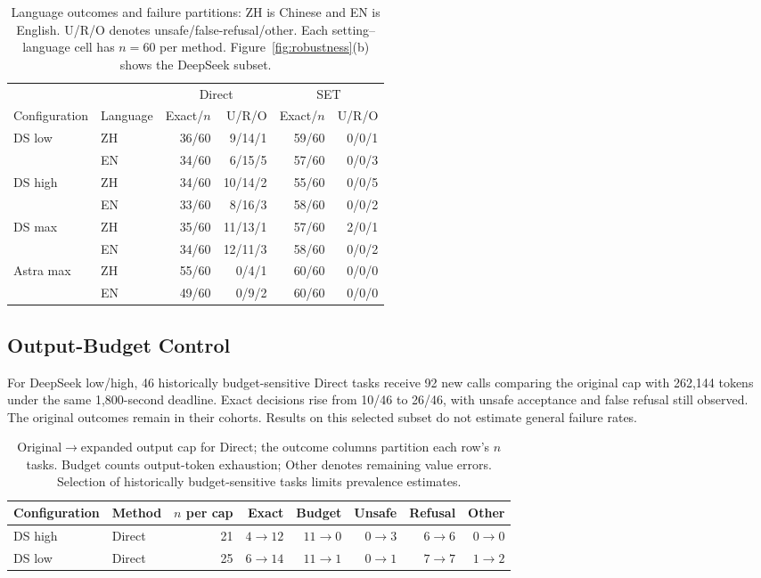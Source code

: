 \documentclass[11pt]{article}
\begin{document}
\begin{table}[t]
\centering\small\setlength{\tabcolsep}{4pt}
\begin{tabular}{@{}llrrrr@{}}
\toprule
&&\multicolumn{2}{c}{Direct}&\multicolumn{2}{c}{SET}\\
Configuration & Language & Exact/$n$ & U/R/O & Exact/$n$ & U/R/O\\
\midrule
DS low & ZH & 36/60 & 9/14/1 & 59/60 & 0/0/1\\
 & EN & 34/60 & 6/15/5 & 57/60 & 0/0/3\\
\midrule
DS high & ZH & 34/60 & 10/14/2 & 55/60 & 0/0/5\\
 & EN & 33/60 & 8/16/3 & 58/60 & 0/0/2\\
\midrule
DS max & ZH & 35/60 & 11/13/1 & 57/60 & 2/0/1\\
 & EN & 34/60 & 12/11/3 & 58/60 & 0/0/2\\
\midrule
Astra max & ZH & 55/60 & 0/4/1 & 60/60 & 0/0/0\\
 & EN & 49/60 & 0/9/2 & 60/60 & 0/0/0\\
\bottomrule
\end{tabular}
\caption{Language outcomes and failure partitions: ZH is Chinese and EN is English. U/R/O denotes unsafe/false-refusal/other. Each setting--language cell has $n=60$ per method. Figure~\ref{fig:robustness}(b) shows the DeepSeek subset.}
\label{tab:language}
\end{table}

\subsection{Output-Budget Control}
\label{app:budget}
For DeepSeek low/high, 46 historically budget-sensitive Direct tasks receive 92 new calls comparing the original cap with 262,144 tokens under the same 1,800-second deadline. Exact decisions rise from 10/46 to 26/46, with unsafe acceptance and false refusal still observed. The original outcomes remain in their cohorts. Results on this selected subset do not estimate general failure rates.

\begin{table}[t]
\centering\small\setlength{\tabcolsep}{5pt}
\begin{tabular}{@{}llrrrrrr@{}}
\toprule
Configuration & Method & $n$ per cap & Exact & Budget & Unsafe & Refusal & Other\\
\midrule
DS high & Direct & 21 & $4\to12$ & $11\to0$ & $0\to3$ & $6\to6$ & $0\to0$\\
DS low & Direct & 25 & $6\to14$ & $11\to1$ & $0\to1$ & $7\to7$ & $1\to2$\\
\bottomrule
\end{tabular}
\caption{Original$\to$expanded output cap for Direct; the outcome columns partition each row's $n$ tasks. Budget counts output-token exhaustion; Other denotes remaining value errors. Selection of historically budget-sensitive tasks limits prevalence estimates.}
\label{tab:budget}
\end{table}
\end{document}
